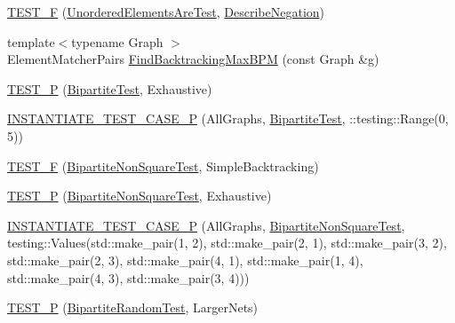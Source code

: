 \begin{DoxyCompactItemize}
\item 
\hyperlink{namespacetesting_1_1gmock__matchers__test_a3c4c92b68a08c5d541e46ed367e216ab}{T\+E\+S\+T\+\_\+F} (\hyperlink{classtesting_1_1gmock__matchers__test_1_1_unordered_elements_are_test}{Unordered\+Elements\+Are\+Test}, \hyperlink{namespacetesting_1_1gmock__matchers__test_afbc8022da5a58aa467ec414ab3e90908}{Describe\+Negation})
\item 
{\footnotesize template$<$typename Graph $>$ }\\Element\+Matcher\+Pairs \hyperlink{namespacetesting_1_1gmock__matchers__test_a09321a8d4a4c40ab1e369fbdf92b0414}{Find\+Backtracking\+Max\+B\+PM} (const Graph \&g)
\item 
\hyperlink{namespacetesting_1_1gmock__matchers__test_a20589d957fcfe5399e249084dbc23e82}{T\+E\+S\+T\+\_\+P} (\hyperlink{classtesting_1_1gmock__matchers__test_1_1_bipartite_test}{Bipartite\+Test}, Exhaustive)
\item 
\hyperlink{namespacetesting_1_1gmock__matchers__test_a16ff96ce4f97da6215f889baccd57e87}{I\+N\+S\+T\+A\+N\+T\+I\+A\+T\+E\+\_\+\+T\+E\+S\+T\+\_\+\+C\+A\+S\+E\+\_\+P} (All\+Graphs, \hyperlink{classtesting_1_1gmock__matchers__test_1_1_bipartite_test}{Bipartite\+Test}, \+::testing\+::\+Range(0, 5))
\item 
\hyperlink{namespacetesting_1_1gmock__matchers__test_a7d2395b1cb6a90bdc8d46ae06f99f6c7}{T\+E\+S\+T\+\_\+F} (\hyperlink{classtesting_1_1gmock__matchers__test_1_1_bipartite_non_square_test}{Bipartite\+Non\+Square\+Test}, Simple\+Backtracking)
\item 
\hyperlink{namespacetesting_1_1gmock__matchers__test_a3ac913ed55a7ac2636ae7bfce04296e9}{T\+E\+S\+T\+\_\+P} (\hyperlink{classtesting_1_1gmock__matchers__test_1_1_bipartite_non_square_test}{Bipartite\+Non\+Square\+Test}, Exhaustive)
\item 
\hyperlink{namespacetesting_1_1gmock__matchers__test_a64ef722e930c3088ddea704ac20194b5}{I\+N\+S\+T\+A\+N\+T\+I\+A\+T\+E\+\_\+\+T\+E\+S\+T\+\_\+\+C\+A\+S\+E\+\_\+P} (All\+Graphs, \hyperlink{classtesting_1_1gmock__matchers__test_1_1_bipartite_non_square_test}{Bipartite\+Non\+Square\+Test}, testing\+::\+Values(std\+::make\+\_\+pair(1, 2), std\+::make\+\_\+pair(2, 1), std\+::make\+\_\+pair(3, 2), std\+::make\+\_\+pair(2, 3), std\+::make\+\_\+pair(4, 1), std\+::make\+\_\+pair(1, 4), std\+::make\+\_\+pair(4, 3), std\+::make\+\_\+pair(3, 4)))
\item 
\hyperlink{namespacetesting_1_1gmock__matchers__test_ace6351a5a34b746491458140b06534ed}{T\+E\+S\+T\+\_\+P} (\hyperlink{classtesting_1_1gmock__matchers__test_1_1_bipartite_random_test}{Bipartite\+Random\+Test}, Larger\+Nets)

\end{DoxyCompactItemize}
